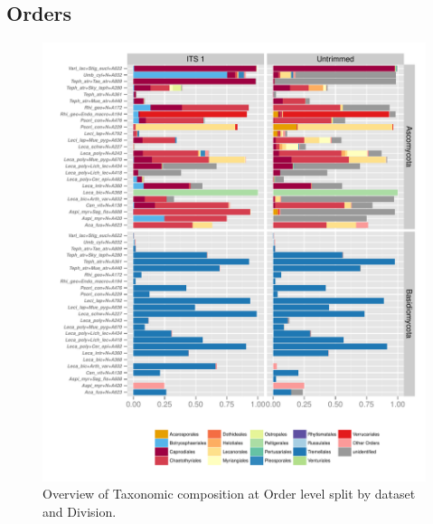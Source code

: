 \documentclass[a4paper, 11]{article}\usepackage[]{graphicx}\usepackage[]{color}
\makeatletter
\def\maxwidth{ %
  \ifdim\Gin@nat@width>\linewidth
    \linewidth
  \else
    \Gin@nat@width
  \fi
}
\newenvironment{knitrout}{}{} %
\makeatother
\begin{document}
%
%
%
\newpage
\subsection{Orders}
\begin{knitrout}
\color{fgcolor}\begin{figure}[H]
\includegraphics[width=\maxwidth]{figure/10_PlotOrders-1} \caption[Overview of Taxonomic composition at Order level split by dataset and Division]{Overview of Taxonomic composition at Order level split by dataset and Division.}\label{fig:10_PlotOrders}
\end{figure}


\end{knitrout}
%
%
\end{document}
